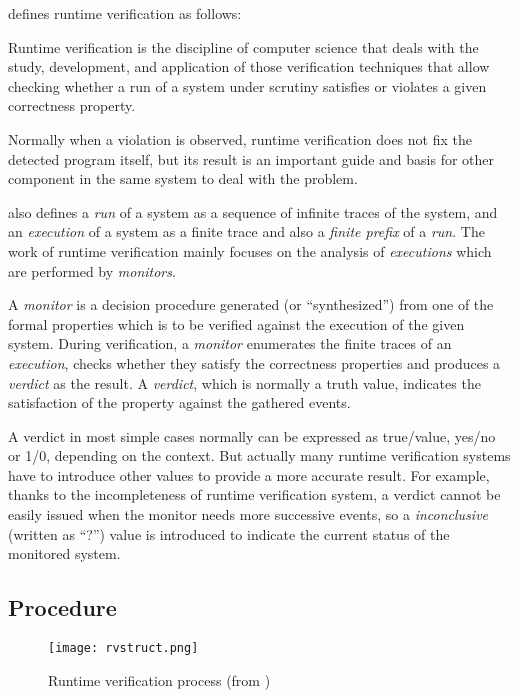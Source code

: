 \cite{leucker2009brief} defines runtime verification as follows:
\begin{displayquote}
Runtime verification is the discipline of computer science that deals with the study, development, and application of those verification techniques that allow checking whether a run of a system under scrutiny satisfies or violates a given correctness property.
\end{displayquote}

Normally when a violation is observed, runtime verification does not fix the detected program itself, but its result is an important guide and basis for other component in the same system to deal with the problem.

\cite{leucker2009brief} also defines a \emph{run} of a system as a sequence of infinite traces of the system, and an \emph{execution} of a system as a finite trace and also a \emph{finite prefix} of a \emph{run}. The work of runtime verification mainly focuses on the analysis of \emph{executions} which are performed by \emph{monitors}.

A \emph{monitor} is a decision procedure generated (or ``synthesized'') from one of the formal properties which is to be verified against the execution of the given system. During verification, a \emph{monitor} enumerates the finite traces of an \emph{execution}, checks whether they satisfy the correctness properties and produces a \emph{verdict} as the result. A \emph{verdict}, which is normally a truth value, indicates the satisfaction of the property against the gathered events.

A verdict in most simple cases normally can be expressed as true/value, yes/no or 1/0, depending on the context. But actually many runtime verification systems have to introduce other values to provide a more accurate result. For example, thanks to the incompleteness of runtime verification system, a verdict cannot be easily issued when the monitor needs more successive events, so a \emph{inconclusive} (written as ``?'') value is introduced to indicate the current status of the monitored system. \citep{falcone2013tutorial}

\subsection{Procedure}

\begin{figure}[h]
\begin{center}
\centering
\texttt{[image: rvstruct.png]}
\caption{Runtime verification process (from \cite{falcone2013tutorial})}
\label{img:rvstruct}
\end{center}
\end{figure}


